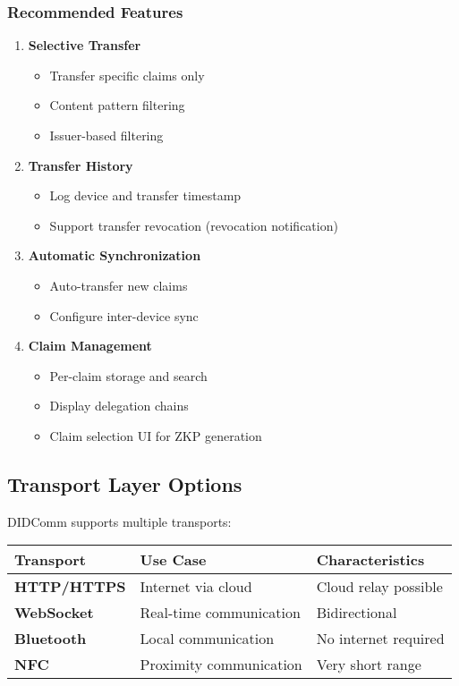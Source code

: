 \subsubsection{Recommended Features}

\begin{enumerate}
  \item \textbf{Selective Transfer}
    \begin{itemize}
      \item Transfer specific claims only
      \item Content pattern filtering
      \item Issuer-based filtering
    \end{itemize}

  \item \textbf{Transfer History}
    \begin{itemize}
      \item Log device and transfer timestamp
      \item Support transfer revocation (revocation notification)
    \end{itemize}

  \item \textbf{Automatic Synchronization}
    \begin{itemize}
      \item Auto-transfer new claims
      \item Configure inter-device sync
    \end{itemize}

  \item \textbf{Claim Management}
    \begin{itemize}
      \item Per-claim storage and search
      \item Display delegation chains
      \item Claim selection UI for ZKP generation
    \end{itemize}
\end{enumerate}

\subsection{Transport Layer Options}

DIDComm supports multiple transports:

\begin{table}[h]
\centering
\begin{tabular}{|l|l|l|}
\hline
\textbf{Transport} & \textbf{Use Case} & \textbf{Characteristics} \\
\hline
\textbf{HTTP/HTTPS} & Internet via cloud & Cloud relay possible \\
\hline
\textbf{WebSocket} & Real-time communication & Bidirectional \\
\hline
\textbf{Bluetooth} & Local communication & No internet required \\
\hline
\textbf{NFC} & Proximity communication & Very short range \\
\hline
\end{tabular}
\end{table}

